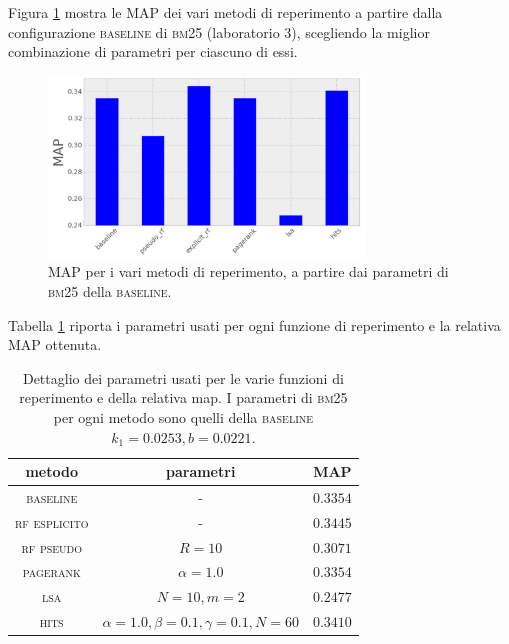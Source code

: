 Figura \ref{fig:map_hist} mostra le MAP dei vari metodi di reperimento a partire dalla configurazione \textsc{baseline} di \textsc{bm25} (laboratorio 3), scegliendo la miglior combinazione di parametri per ciascuno di essi. 
\begin{figure}[htpb]
	\begin{center}
		\includegraphics[width=0.75\textwidth]{figures/hist_map.png}
		\caption{MAP per i vari metodi di reperimento, a partire dai parametri di \textsc{bm25} della \textsc{baseline}.}
		\label{fig:map_hist}
	\end{center}
\end{figure}
Tabella \ref{tab:map} riporta i parametri usati per ogni funzione di reperimento e la relativa MAP ottenuta.
\begin{table}[htpb]
	\begin{center}
		\begin{tabular}{|c|c|c|}
			\hline
			metodo & parametri & MAP \\
			\hline
			\textsc{baseline} & - & $0.3354$ \\
			\textsc{rf esplicito} & - & $0.3445$ \\
			\textsc{rf pseudo} & $R=10$ & $0.3071$ \\
			\textsc{pagerank} & $\alpha=1.0$ & $0.3354$ \\
			\textsc{lsa} & $N=10, m=2$ & $0.2477$ \\
			\textsc{hits} & $\alpha=1.0, \beta=0.1, \gamma=0.1, N=60$ & $0.3410$ \\
			\hline
		\end{tabular}
	\end{center}
	\caption{Dettaglio dei parametri usati per le varie funzioni di reperimento e della relativa map. I parametri di \textsc{bm25} per ogni metodo sono quelli della \textsc{baseline} $k_1 = 0.0253, b = 0.0221$.}
	\label{tab:map}
\end{table}


